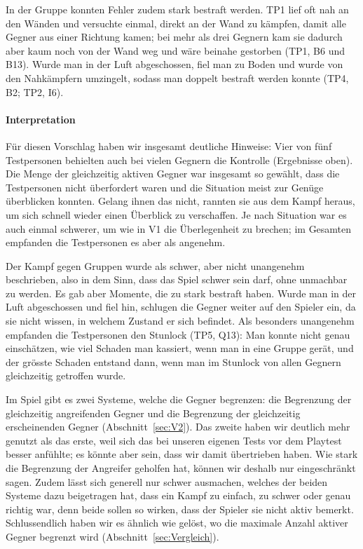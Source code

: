 \documentclass[../Main.tex]{subfiles}
\begin{document}
In der Gruppe konnten Fehler zudem stark bestraft werden. TP1 lief oft nah an den Wänden und versuchte einmal, direkt an der Wand zu kämpfen, damit alle Gegner aus einer Richtung kamen; bei mehr als drei Gegnern kam sie dadurch aber kaum noch von der Wand weg und wäre beinahe gestorben (TP1, B6 und B13). Wurde man in der Luft abgeschossen, fiel man zu Boden und wurde von den Nahkämpfern umzingelt, sodass man doppelt bestraft werden konnte (TP4, B2; TP2, I6).

\paragraph{Interpretation}
Für diesen Vorschlag haben wir insgesamt deutliche Hinweise: Vier von fünf Testpersonen behielten auch bei vielen Gegnern die Kontrolle (Ergebnisse oben). Die Menge der gleichzeitig aktiven Gegner war insgesamt so gewählt, dass die Testpersonen nicht überfordert waren und die Situation meist zur Genüge überblicken konnten. Gelang ihnen das nicht, rannten sie aus dem Kampf heraus, um sich schnell wieder einen Überblick zu verschaffen. Je nach Situation war es auch einmal schwerer, um wie in V1 die Überlegenheit zu brechen; im Gesamten empfanden die Testpersonen es aber als angenehm.

Der Kampf gegen Gruppen wurde als schwer, aber nicht unangenehm beschrieben, also in dem Sinn, dass das Spiel schwer sein darf, ohne unmachbar zu werden. Es gab aber Momente, die zu stark bestraft haben. Wurde man in der Luft abgeschossen und fiel hin, schlugen die Gegner weiter auf den Spieler ein, da sie nicht wissen, in welchem Zustand er sich befindet. Als besonders unangenehm empfanden die Testpersonen den Stunlock (TP5, Q13): Man konnte nicht genau einschätzen, wie viel Schaden man kassiert, wenn man in eine Gruppe gerät, und der grösste Schaden entstand dann, wenn man im Stunlock von allen Gegnern gleichzeitig getroffen wurde.

Im Spiel gibt es zwei Systeme, welche die Gegner begrenzen: die Begrenzung der gleichzeitig angreifenden Gegner und die Begrenzung der gleichzeitig erscheinenden Gegner (Abschnitt~\ref{sec:V2}). Das zweite haben wir deutlich mehr genutzt als das erste, weil sich das bei unseren eigenen Tests vor dem Playtest besser anfühlte; es könnte aber sein, dass wir damit übertrieben haben. Wie stark die Begrenzung der Angreifer geholfen hat, können wir deshalb nur eingeschränkt sagen. Zudem lässt sich generell nur schwer ausmachen, welches der beiden Systeme dazu beigetragen hat, dass ein Kampf zu einfach, zu schwer oder genau richtig war, denn beide sollen so wirken, dass der Spieler sie nicht aktiv bemerkt. Schlussendlich haben wir es ähnlich wie  gelöst, wo die maximale Anzahl aktiver Gegner begrenzt wird (Abschnitt~\ref{sec:Vergleich}).
\end{document}
